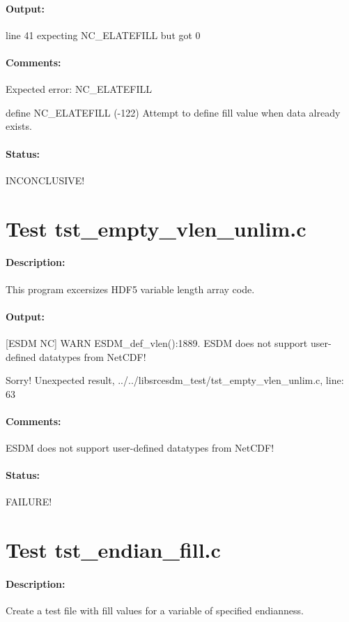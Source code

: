 \paragraph{Output:} line 41 expecting NC\_ELATEFILL but got 0

\paragraph{Comments:} Expected error: NC\_ELATEFILL

define NC\_ELATEFILL     (-122)    Attempt to define fill value when data already exists.

\paragraph{Status:} INCONCLUSIVE!

\section{Test tst\_empty\_vlen\_unlim.c}

\paragraph{Description:} This program excersizes HDF5 variable length array code.

\paragraph{Output:} [ESDM NC] WARN ESDM\_def\_vlen():1889. ESDM does not support user-defined datatypes from NetCDF!

Sorry! Unexpected result, ../../libsrcesdm\_test/tst\_empty\_vlen\_unlim.c, line: 63

\paragraph{Comments:} ESDM does not support user-defined datatypes from NetCDF!

\paragraph{Status:} FAILURE!

\section{Test tst\_endian\_fill.c}

\paragraph{Description:} Create a test file with fill values for a variable of specified endianness.

